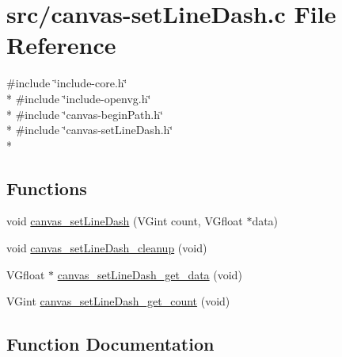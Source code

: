 \hypertarget{canvas-setLineDash_8c}{}\section{src/canvas-\/set\+Line\+Dash.c File Reference}
\label{canvas-setLineDash_8c}
{\ttfamily \#include \char`\"{}include-\/core.\+h\char`\"{}}\\*
{\ttfamily \#include \char`\"{}include-\/openvg.\+h\char`\"{}}\\*
{\ttfamily \#include \char`\"{}canvas-\/begin\+Path.\+h\char`\"{}}\\*
{\ttfamily \#include \char`\"{}canvas-\/set\+Line\+Dash.\+h\char`\"{}}\\*
\subsection*{Functions}
\begin{DoxyCompactItemize}
\item 
void \hyperlink{canvas-setLineDash_8c_ad9a61343ebe550729606465767eadf8f}{canvas\+\_\+set\+Line\+Dash} (V\+Gint count, V\+Gfloat $\ast$data)
\item 
void \hyperlink{canvas-setLineDash_8c_ae54e972b2cf53e6178968d2b25a56d07}{canvas\+\_\+set\+Line\+Dash\+\_\+cleanup} (void)
\item 
V\+Gfloat $\ast$ \hyperlink{canvas-setLineDash_8c_af5a4ac39592594db4dc40f11c9ec3f9d}{canvas\+\_\+set\+Line\+Dash\+\_\+get\+\_\+data} (void)
\item 
V\+Gint \hyperlink{canvas-setLineDash_8c_a4743c7f0d3b595a10cc9de51794454dc}{canvas\+\_\+set\+Line\+Dash\+\_\+get\+\_\+count} (void)
\end{DoxyCompactItemize}


\subsection{Function Documentation}
\hypertarget{canvas-setLineDash_8c_ad9a61343ebe550729606465767eadf8f}{}
